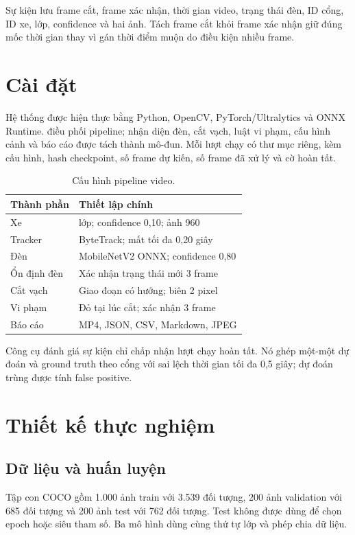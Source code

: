 \documentclass[11pt,a4paper]{article}
\newcommand{\code}[1]{{\small\texttt{\detokenize{#1}}}}
\begin{document}
Sự kiện lưu frame cắt, frame xác nhận, thời gian video, trạng thái đèn, ID cổng, ID xe, lớp, confidence và hai ảnh. Tách frame cắt khỏi frame xác nhận giữ đúng mốc thời gian thay vì gán thời điểm muộn do điều kiện nhiều frame.

\section{Cài đặt}
Hệ thống được hiện thực bằng Python, OpenCV, PyTorch/Ultralytics và ONNX Runtime. \code{main.py} điều phối pipeline; nhận diện đèn, cắt vạch, luật vi phạm, cấu hình cảnh và báo cáo được tách thành mô-đun. Mỗi lượt chạy có thư mục riêng, kèm cấu hình, hash checkpoint, số frame dự kiến, số frame đã xử lý và cờ hoàn tất.

\begin{table}[t]
\centering\small
\begin{tabularx}{\columnwidth}{@{}l>{\raggedright\arraybackslash}X@{}}
\toprule Thành phần & Thiết lập chính \\
\midrule
Xe & 5 lớp; confidence 0,10; ảnh 960 \\
Tracker & ByteTrack; mất tối đa 0,20 giây \\
Đèn & MobileNetV2 ONNX; confidence 0,80 \\
Ổn định đèn & Xác nhận trạng thái mới 3 frame \\
Cắt vạch & Giao đoạn có hướng; biên 2 pixel \\
Vi phạm & Đỏ tại lúc cắt; xác nhận 3 frame \\
Báo cáo & MP4, JSON, CSV, Markdown, JPEG \\
\bottomrule
\end{tabularx}
\caption{Cấu hình pipeline video.}
\label{tab:runtime}
\end{table}

Công cụ đánh giá sự kiện chỉ chấp nhận lượt chạy hoàn tất. Nó ghép một-một dự đoán và ground truth theo cổng với sai lệch thời gian tối đa 0,5 giây; dự đoán trùng được tính false positive.

\section{Thiết kế thực nghiệm}
\subsection{Dữ liệu và huấn luyện}
Tập con COCO gồm 1.000 ảnh train với 3.539 đối tượng, 200 ảnh validation với 685 đối tượng và 200 ảnh test với 762 đối tượng. Test không được dùng để chọn epoch hoặc siêu tham số. Ba mô hình dùng cùng thứ tự lớp và phép chia dữ liệu.
\end{document}
